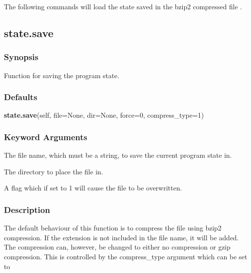 The following commands will load the state saved in the bzip2 compressed file 
.







\newpage

\subsection{state.save}


\subsubsection{Synopsis}

Function for saving the program state.

\subsubsection{Defaults}

\textsf{\textbf{state.save}(self, file=None, dir=None, force=0, compress\_type=1)}


\subsubsection{Keyword Arguments}


  The file name, which must be a string, to save the current program state in.

  The directory to place the file in.

  A flag which if set to 1 will cause the file to be overwritten.

\subsubsection{Description}

The default behaviour of this function is to compress the file using bzip2 compression.  If
the extension 
 is not included in the file name, it will be added.  The compression
can, however, be changed to either no compression or gzip compression.  This is controlled
by the compress\_type argument which can be set to

